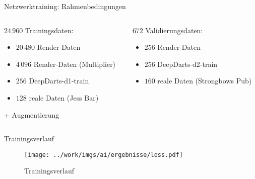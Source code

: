 \begin{frame}{Netzwerktraining: Rahmenbedingungen}

    \begin{columns}
        \begin{column}{0.5\linewidth}

            $24\,960$ Trainingsdaten:
            \vspace*{-0.1cm}
            \begin{itemize}
                \setlength\itemsep{0em}
                \item $20\,480$ Render-Daten
                \item $4\,096$ Render-Daten (Multiplier)
                \item $256$ DeepDarts-d1-train
                \item $128$ reale Daten (Jess Bar)
            \end{itemize}
            + Augmentierung

        \end{column}
        \begin{column}{0.5\linewidth}

            $672$ Validierungsdaten:
            \vspace*{-0.1cm}
            \begin{itemize}
                \setlength\itemsep{0em}
                \item $256$ Render-Daten
                \item $256$ DeepDarts-d2-train
                \item $160$ reale Daten (Strongbows Pub)
            \end{itemize}

        \end{column}
    \end{columns}

    \vspace*{0.5cm}


\end{frame}

\begin{frame}{Trainingsverlauf}

    \begin{figure}
        \centering
        \texttt{[image: ../work/imgs/ai/ergebnisse/loss.pdf]}
        \caption{Trainingsverlauf}
    \end{figure}

\end{frame}

